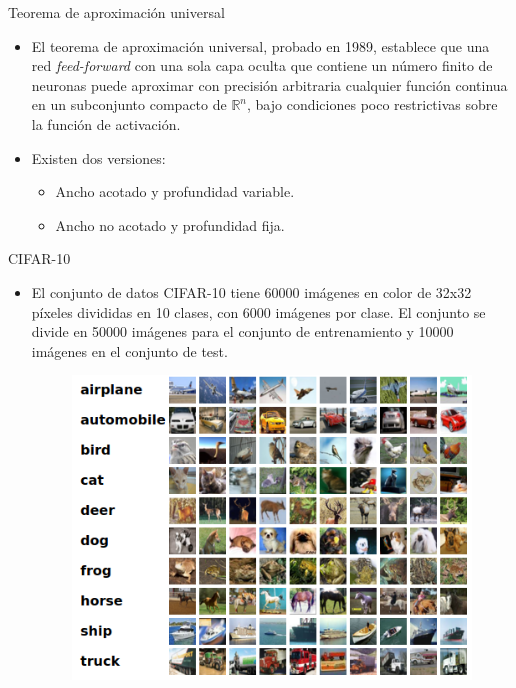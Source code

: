 \documentclass[spanish]{beamer}
\begin{document}
\begin{frame}{Teorema de aproximación universal}
  \begin{itemize}
\item El teorema de aproximación universal, probado en 1989, establece que una red \textit{feed-forward} con una sola capa oculta que contiene un número finito de neuronas puede aproximar con precisión arbitraria cualquier función continua en un subconjunto compacto de $\mathbb{R}^n$, bajo condiciones poco restrictivas sobre la función de activación.
\item Existen dos versiones:
\begin{itemize}
  \item Ancho acotado y profundidad variable.
  \item Ancho no acotado y profundidad fija.
\end{itemize}
  \end{itemize}

\end{frame}

\begin{frame}{CIFAR-10}
\begin{itemize}
  \item El conjunto de datos CIFAR-10 tiene 60000 imágenes en color de 32x32 píxeles divididas en 10 clases, con 6000 imágenes por clase. El conjunto se divide en 50000 imágenes para el conjunto de entrenamiento y 10000 imágenes en el conjunto de test.
  \begin{figure}[h]
    \centering
    \includegraphics[width=.6\textwidth]{img/cifar10}
  \end{figure}
\end{itemize}

\end{frame}
\end{document}
